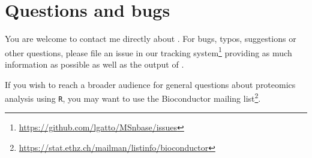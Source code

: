 \section*{Questions and bugs}

You are welcome to contact me directly about . For
bugs, typos, suggestions or other questions, please file an issue in
our tracking
system\footnote{\url{https://github.com/lgatto/MSnbase/issues}}
providing as much information as possible as well as the output of
.

If you wish to reach a broader audience for general questions about
proteomics analysis using \texttt{R}, you may want to use the
Bioconductor mailing
list\footnote{\url{https://stat.ethz.ch/mailman/listinfo/bioconductor}}.
